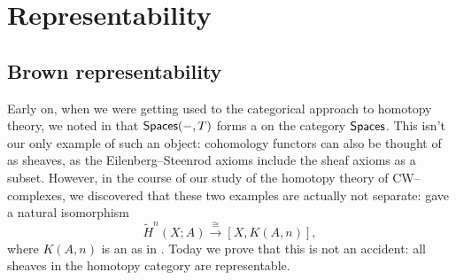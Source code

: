
\chapter{Representability}\label{RepChap}





\section{Brown representability}\label{BrownRepSec}

Early on, when we were getting used to the categorical approach to homotopy theory, we noted in  that $\mathsf{Spaces}(-, T)$ forms a  on the category $\mathsf{Spaces}$.
This isn't our only example of such an object: cohomology functors can also be thought of as sheaves, as the Eilenberg--Steenrod axioms include the sheaf axioms as a subset.
However, in the course of our study of the homotopy theory of CW--complexes, we discovered that these two examples are actually not separate:  gave a natural isomorphism \[\widetilde H^n(X; A) \xrightarrow\cong [X, K(A, n)],\] where $K(A, n)$ is an  as in .
Today we prove that this is not an accident: all sheaves in the homotopy category are representable.

